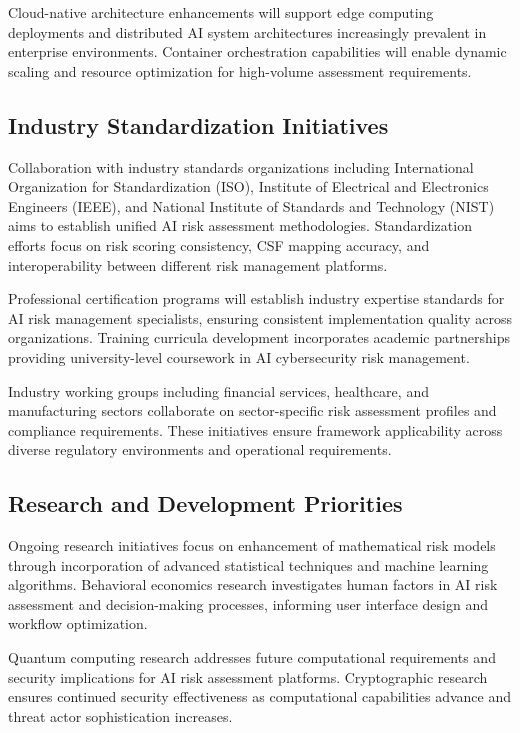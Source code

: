 \documentclass[11pt,letterpaper]{article}
\begin{document}
Cloud-native architecture enhancements will support edge computing deployments and distributed AI system architectures increasingly prevalent in enterprise environments. Container orchestration capabilities will enable dynamic scaling and resource optimization for high-volume assessment requirements.

\subsection{Industry Standardization Initiatives}

Collaboration with industry standards organizations including International Organization for Standardization (ISO), Institute of Electrical and Electronics Engineers (IEEE), and National Institute of Standards and Technology (NIST) aims to establish unified AI risk assessment methodologies. Standardization efforts focus on risk scoring consistency, CSF mapping accuracy, and interoperability between different risk management platforms.

Professional certification programs will establish industry expertise standards for AI risk management specialists, ensuring consistent implementation quality across organizations. Training curricula development incorporates academic partnerships providing university-level coursework in AI cybersecurity risk management.

Industry working groups including financial services, healthcare, and manufacturing sectors collaborate on sector-specific risk assessment profiles and compliance requirements. These initiatives ensure framework applicability across diverse regulatory environments and operational requirements.

\subsection{Research and Development Priorities}

Ongoing research initiatives focus on enhancement of mathematical risk models through incorporation of advanced statistical techniques and machine learning algorithms. Behavioral economics research investigates human factors in AI risk assessment and decision-making processes, informing user interface design and workflow optimization.

Quantum computing research addresses future computational requirements and security implications for AI risk assessment platforms. Cryptographic research ensures continued security effectiveness as computational capabilities advance and threat actor sophistication increases.
\end{document}
